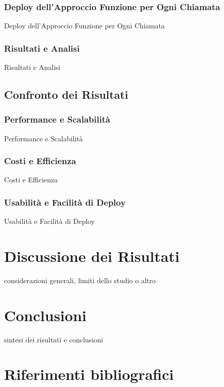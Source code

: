\documentclass[12pt,a4paper,twoside]{book}
\begin{document}
\subsection{Deploy dell’Approccio Funzione per Ogni Chiamata}
Deploy dell’Approccio Funzione per Ogni Chiamata

\subsection{Risultati e Analisi}
Risultati e Analisi

\section{Confronto dei Risultati}
\subsection{Performance e Scalabilità}
Performance e Scalabilità

\subsection{Costi e Efficienza}
Costi e Efficienza

\subsection{Usabilità e Facilità di Deploy}
Usabilità e Facilità di Deploy

\chapter{Discussione dei Risultati}
considerazioni generali, limiti dello studio o altro

\chapter{Conclusioni}
sintesi dei risultati e conclusioni

\renewcommand{\bibsection}{}
\chapter*{Riferimenti bibliografici}

\end{document}
